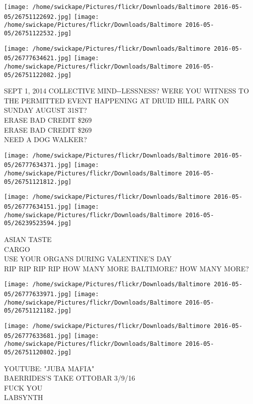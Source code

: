 \documentclass[10pt,letterpaper]{article}
\begin{document}
\texttt{[image: /home/swickape/Pictures/flickr/Downloads/Baltimore 2016-05-05/26751122692.jpg]}
\texttt{[image: /home/swickape/Pictures/flickr/Downloads/Baltimore 2016-05-05/26751122532.jpg]}

\texttt{[image: /home/swickape/Pictures/flickr/Downloads/Baltimore 2016-05-05/26777634621.jpg]}
\texttt{[image: /home/swickape/Pictures/flickr/Downloads/Baltimore 2016-05-05/26751122082.jpg]}

SEPT 1, 2014 COLLECTIVE MIND{-}{-}LESSNESS?  WERE YOU WITNESS TO THE PERMITTED EVENT HAPPENING AT DRUID HILL PARK ON SUNDAY AUGUST 31ST?\\
ERASE BAD CREDIT \$269\\
ERASE BAD CREDIT \$269\\
NEED A DOG WALKER?\\
\pagebreak

\texttt{[image: /home/swickape/Pictures/flickr/Downloads/Baltimore 2016-05-05/26777634371.jpg]}
\texttt{[image: /home/swickape/Pictures/flickr/Downloads/Baltimore 2016-05-05/26751121812.jpg]}

\texttt{[image: /home/swickape/Pictures/flickr/Downloads/Baltimore 2016-05-05/26777634151.jpg]}
\texttt{[image: /home/swickape/Pictures/flickr/Downloads/Baltimore 2016-05-05/26239523594.jpg]}

ASIAN TASTE\\
CARGO\\
USE YOUR ORGANS DURING VALENTINE'S DAY\\
RIP RIP RIP RIP HOW MANY MORE BALTIMORE?  HOW MANY MORE?\\
\pagebreak

\texttt{[image: /home/swickape/Pictures/flickr/Downloads/Baltimore 2016-05-05/26777633971.jpg]}
\texttt{[image: /home/swickape/Pictures/flickr/Downloads/Baltimore 2016-05-05/26751121182.jpg]}

\texttt{[image: /home/swickape/Pictures/flickr/Downloads/Baltimore 2016-05-05/26777633681.jpg]}
\texttt{[image: /home/swickape/Pictures/flickr/Downloads/Baltimore 2016-05-05/26751120802.jpg]}

YOUTUBE: "JUBA MAFIA"\\
BAERRIDES'S TAKE OTTOBAR 3/9/16\\
FUCK YOU\\
LABSYNTH\\
\pagebreak
\end{document}
